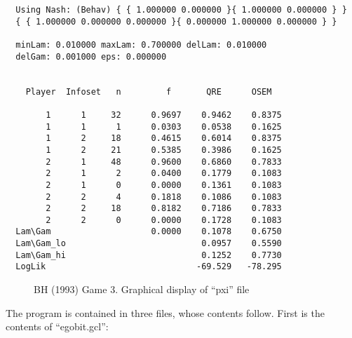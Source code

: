\begin{verbatim}
  Using Nash: (Behav) { { 1.000000 0.000000 }{ 1.000000 0.000000 } }
  { { 1.000000 0.000000 0.000000 }{ 0.000000 1.000000 0.000000 } }

  minLam: 0.010000 maxLam: 0.700000 delLam: 0.010000
  delGam: 0.001000 eps: 0.000000


    Player  Infoset   n         f       QRE      OSEM

        1      1     32      0.9697    0.9462    0.8375
        1      1      1      0.0303    0.0538    0.1625
        1      2     18      0.4615    0.6014    0.8375
        1      2     21      0.5385    0.3986    0.1625
        2      1     48      0.9600    0.6860    0.7833
        2      1      2      0.0400    0.1779    0.1083
        2      1      0      0.0000    0.1361    0.1083
        2      2      4      0.1818    0.1086    0.1083
        2      2     18      0.8182    0.7186    0.7833
        2      2      0      0.0000    0.1728    0.1083
  Lam\Gam                    0.0000    0.1078    0.6750
  Lam\Gam_lo                           0.0957    0.5590
  Lam\Gam_hi                           0.1252    0.7730
  LogLik                              -69.529   -78.295
\end{verbatim}


\newpage
\begin{figure}[htp]
\centerline{}
\vspace{.5in}
\centerline{}
\caption{BH (1993) Game 3. Graphical display of ``pxi'' file }
\end{figure}

\noindent
The program is contained in three files, whose contents follow.  First
is the contents of ``egobit.gcl'':

